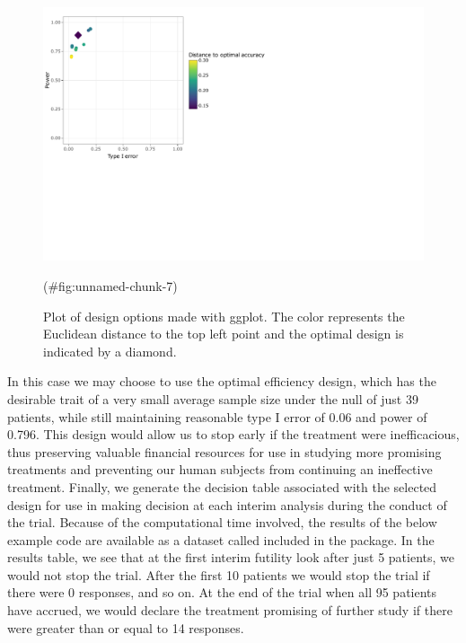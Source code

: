 \begin{Schunk}
\begin{figure}
\includegraphics{zabor-hobbs-kane_files/figure-latex/unnamed-chunk-7-1} \caption[Plot of design options made with ggplot]{Plot of design options made with ggplot. The color represents the Euclidean distance to the top left point and the optimal design is indicated by a diamond.}(\#fig:unnamed-chunk-7)
\end{figure}
\end{Schunk}

In this case we may choose to use the optimal efficiency design, which
has the desirable trait of a very small average sample size under the
null of just 39 patients, while still maintaining reasonable type I
error of 0.06 and power of 0.796. This design would allow us to stop
early if the treatment were inefficacious, thus preserving valuable
financial resources for use in studying more promising treatments and
preventing our human subjects from continuing an ineffective treatment.
Finally, we generate the decision table associated with the selected
design for use in making decision at each interim analysis during the
conduct of the trial. Because of the computational time involved, the
results of the below example code are available as a dataset called
 included in the  package.
In the results table, we see that at the first interim futility look
after just 5 patients, we would not stop the trial. After the first 10
patients we would stop the trial if there were 0 responses, and so on.
At the end of the trial when all 95 patients have accrued, we would
declare the treatment promising of further study if there were greater
than or equal to 14 responses.

